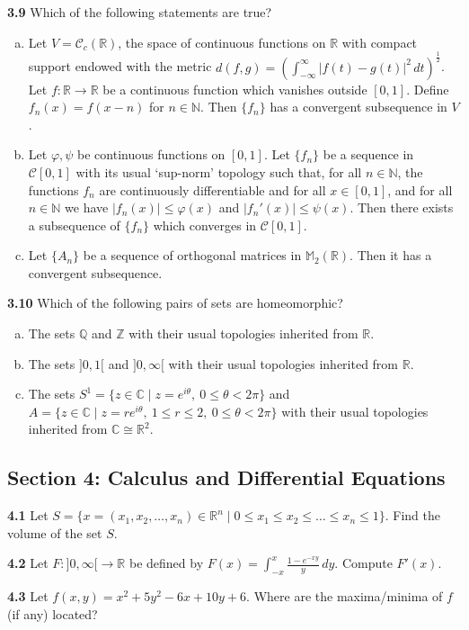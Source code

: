 \documentclass[11pt,a4paper]{article}
\newcommand{\N}{\mathbb{N}}
\newcommand{\Z}{\mathbb{Z}}
\newcommand{\Q}{\mathbb{Q}}
\newcommand{\R}{\mathbb{R}}
\newcommand{\C}{\mathbb{C}}
\newcommand{\M}{\mathbb{M}}
\newcommand{\examsec}[1]{%
  \subsection*{#1}
  \vspace{-2pt}
}
\newcommand{\qitem}[1]{\par\medskip\noindent\textbf{#1}\hspace{0.5em}}
\begin{document}
\qitem{3.9} Which of the following statements are true?
\begin{enumerate}[a.]
  \item Let $V = \mathcal{C}_c(\R)$, the space of continuous functions on $\R$ with compact support endowed with the metric $d(f, g) = \left(\int_{-\infty}^{\infty} |f(t) - g(t)|^2\,dt\right)^{\frac{1}{2}}$. Let $f : \R \to \R$ be a continuous function which vanishes outside $[0, 1]$. Define $f_n(x) = f(x - n)$ for $n \in \N$. Then $\{f_n\}$ has a convergent subsequence in $V$.
  \item Let $\varphi, \psi$ be continuous functions on $[0, 1]$. Let $\{f_n\}$ be a sequence in $\mathcal{C}[0, 1]$ with its usual `sup-norm' topology such that, for all $n \in \N$, the functions $f_n$ are continuously differentiable and for all $x \in [0, 1]$, and for all $n \in \N$ we have $|f_n(x)| \le \varphi(x)$ and $|f_n'(x)| \le \psi(x)$. Then there exists a subsequence of $\{f_n\}$ which converges in $\mathcal{C}[0, 1]$.
  \item Let $\{A_n\}$ be a sequence of orthogonal matrices in $\M_2(\R)$. Then it has a convergent subsequence.
\end{enumerate}

\qitem{3.10} Which of the following pairs of sets are homeomorphic?
\begin{enumerate}[a.]
  \item The sets $\Q$ and $\Z$ with their usual topologies inherited from $\R$.
  \item The sets $]0, 1[$ and $]0, \infty[$ with their usual topologies inherited from $\R$.
  \item The sets $S^1 = \{z \in \C \mid z = e^{i\theta},\ 0 \le \theta < 2\pi\}$ and $A = \{z \in \C \mid z = re^{i\theta},\ 1 \le r \le 2,\ 0 \le \theta < 2\pi\}$ with their usual topologies inherited from $\C \cong \R^2$.
\end{enumerate}

\examsec{Section 4: Calculus and Differential Equations}

\qitem{4.1} Let $S = \{x = (x_1, x_2, \dots, x_n) \in \R^n \mid 0 \le x_1 \le x_2 \le \dots \le x_n \le 1\}$. Find the volume of the set $S$.

\qitem{4.2} Let $F : ]0, \infty[ \to \R$ be defined by $F(x) = \displaystyle\int_{-x}^{x} \frac{1 - e^{-xy}}{y}\,dy$. Compute $F'(x)$.

\qitem{4.3} Let $f(x, y) = x^2 + 5y^2 - 6x + 10y + 6$. Where are the maxima/minima of $f$ (if any) located?
\end{document}
